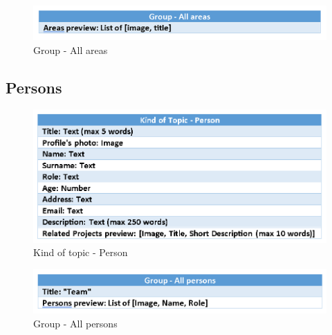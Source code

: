 \documentclass[11pt, letterpaper]{article}
\begin{document}
\begin{figure}[H]
    \centering
    \includegraphics[width=15cm]{images/Content_in_the_small/Group-All_areas.png}
    \caption{Group - All areas}
    \label{fig:enter-label}
\end{figure}

\subsection{Persons}
\begin{figure}[H]
    \centering
    \includegraphics[width=15cm]{images/Content_in_the_small/Kind_of_topic-person.png}
    \caption{Kind of topic - Person}
    \label{fig:enter-label}
\end{figure}
\begin{figure}[H]
    \centering
    \includegraphics[width=15cm]{images/Content_in_the_small/Group-All_person.png}
    \caption{Group - All persons}
    \label{fig:enter-label}
\end{figure}
\end{document}

